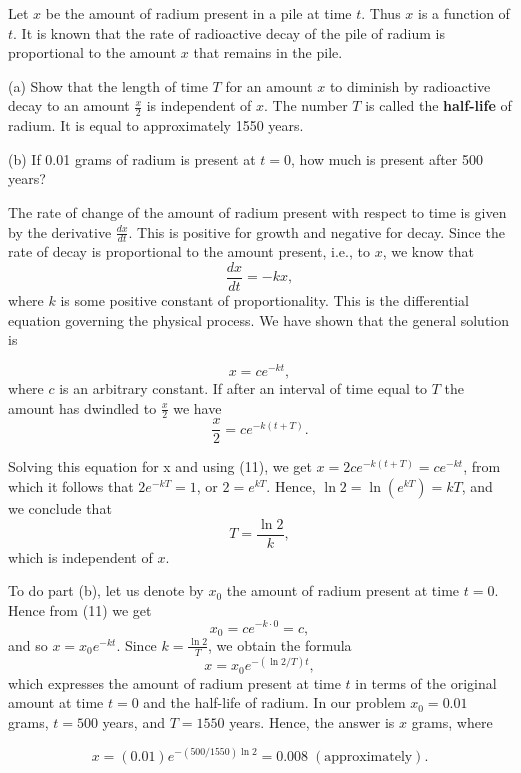 \begin{example} Let $x$ be the amount of radium present in a pile at time $t$. Thus $x$ is a function of $t$.  It is known that the rate of radioactive decay of the pile of radium is proportional to the amount $x$ that remains in the pile.

(a) Show that the length of time $T$ for an amount $x$ to diminish by radioactive decay to an amount $\frac{x}{2}$ is independent of $x$. The number $T$ is called the \textbf{half-life} of radium. It is equal 
to approximately 1550 years.

(b) If 0.01 grams of radium is present at $t = 0$, how much is present after 500 years?

The rate of change of the amount of radium present with respect to time is given by the derivative $\frac{dx}{dt}$. This is positive for growth and negative for decay. Since the rate of decay is proportional to the amount present, i.e., to $x$, we know that
$$
\frac{dx}{dt} = -kx,
$$
\noindent where $k$ is some positive constant of proportionality. This is the differential equation governing the physical process. We have shown that the general solution is 

\begin{equation}
x = ce^{-kt},
\label{eq5.5.11}
\end{equation}
\noindent where $c$ is an arbitrary constant. If after an interval of time equal to $T$ the amount has dwindled to $\frac{x}{2}$ we have
$$
\frac{x}{2} = ce^{-k( t+T)}.
$$

\noindent Solving this equation for x and using (11), we get $x = 2ce^{-k(t + T)} = ce^{-kt}$, from which it follows that $2e^{-kT} = 1$, or $2 = e^{kT}$. Hence, $\ln 2 = \ln(e^{kT}) = kT$, and we conclude that
$$
T = \frac{\ln 2}{k},
$$
\noindent which is independent of $x$.
\medskip

To do part (b), let us denote by $x_{0}$ the amount of radium present at time $t = 0$. Hence from (11) we get
$$
x_{0} = ce^{-k \cdot 0} = c, 
$$
\noindent and so $x = x_{0}e^{-kt}$. Since $k = \frac{\ln 2}{T}$, we obtain the formula
$$
x = x_{0}e^{-(\ln 2/T)t},
$$
\noindent which expresses the amount of radium present at time $t$ in terms of the original amount at time $t = 0$ and the half-life of radium. In our problem $x_{0} = 0.01$ grams, $t = 500$ years, and $T = 1550$ years. Hence, the answer is $x$ grams, where

$$
x = (0.01)e^{-(500/1550) \ln 2} = 0.008\; (\mbox{approximately}).
$$
\end{example}
